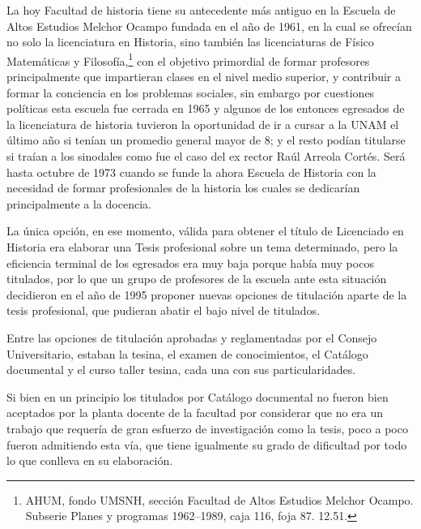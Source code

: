 \bigskip
{}

\noindent La hoy Facultad de historia tiene su antecedente más antiguo 
en la Escuela de Altos Estudios Melchor Ocampo fundada en el año de 
1961, en la cual se ofrecían no solo la licenciatura en Historia, sino 
también las licenciaturas de Físico Matemáticas y 
Filosofía,\footnote{AHUM, fondo UMSNH, sección Facultad de Altos 
Estudios Melchor Ocampo. Subserie Planes y programas 1962--1989, caja 
116, foja 87. 12.51.} con el objetivo primordial de formar profesores 
principalmente que impartieran clases en el nivel medio superior, y 
contribuir a formar la conciencia en los problemas sociales, sin 
embargo por cuestiones políticas esta escuela fue cerrada en 1965 y 
algunos de los entonces egresados de la licenciatura de historia 
tuvieron la oportunidad de ir a cursar a la UNAM el último año si 
tenían un promedio general mayor de 8; y el resto podían titularse si 
traían a los sinodales como fue el caso del ex rector Raúl Arreola 
Cortés.%
 Será hasta octubre de 1973 cuando se funde la ahora Escuela de Historia con 
la necesidad de formar profesionales de la historia los cuales se dedicarían 
principalmente a la docencia.



\medskip
{}

\noindent La única opción, en ese momento, válida para obtener el 
título de Licenciado en Historia era elaborar una Tesis profesional 
sobre un tema determinado, pero la eficiencia terminal de los egresados 
era muy baja porque había muy pocos titulados, por lo que un grupo de 
profesores de la escuela ante esta situación decidieron en el año de 
1995 proponer nuevas opciones de titulación aparte de la tesis 
profesional, que pudieran abatir el bajo nivel de titulados.

Entre las opciones de titulación aprobadas y reglamentadas por el 
Consejo Universitario, estaban la tesina, el examen de conocimientos, 
el Catálogo documental y el curso taller tesina, cada una con sus 
particularidades.

Si bien en un principio los titulados por Catálogo documental no fueron 
bien aceptados por la planta docente de la facultad por considerar que 
no era un trabajo que requería de gran esfuerzo de investigación como 
la tesis, poco a poco fueron admitiendo esta vía, que tiene igualmente 
su grado de dificultad por todo lo que conlleva en su elaboración.

